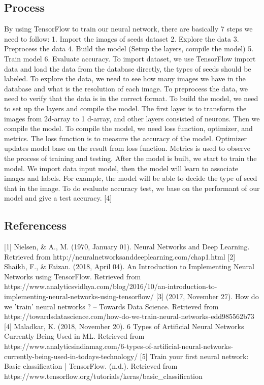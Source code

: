 \subsection{Process}
By using TensorFlow to train our neural network, there are basically 7 steps we need to follow: 1. Import the images of seeds dataset 2. Explore the data 3. Preprocess the data 4. Build the model (Setup the layers, compile the model) 5. Train model 6. Evaluate accuracy. To import dataset, we use TensorFlow import data and load the data from the database directly, the types of seeds should be labeled. To explore the data, we need to see how many images we have in the database and what is the resolution of each image. To preprocess the data, we need to verify that the data is in the correct format. To build the model, we need to set up the layers and compile the model. The first layer is to transform the images from 2d-array to 1 d-array, and other layers consisted of neurons. Then we compile the model. To compile the model, we need loss function, optimizer, and metrics. The loss function is to measure the accuracy of the model. Optimizer updates model base on the result from loss function. Metrics is used to observe the process of training and testing. After the model is built, we start to train the model. We import data input model, then the model will learn to associate images and labels. For example, the model will be able to decide the type of seed that in the image. To do evaluate accuracy test, we base on the performant of our model and give a test accuracy. [4]

\subsection{Referencess}
[1]
Nielsen, \& A., M. (1970, January 01). Neural Networks and Deep Learning. Retrieved from http://neuralnetworksanddeeplearning.com/chap1.html
[2]
Shaikh, F., \& Faizan. (2018, April 04). An Introduction to Implementing Neural Networks using TensorFlow. Retrieved from https://www.analyticsvidhya.com/blog/2016/10/an-introduction-to-implementing-neural-networks-using-tensorflow/
[3]
(2017, November 27). How do we 'train' neural networks ? – Towards Data Science. Retrieved from https://towardsdatascience.com/how-do-we-train-neural-networks-edd985562b73
[4]
Maladkar, K. (2018, November 20). 6 Types of Artificial Neural Networks Currently Being Used in ML. Retrieved from https://www.analyticsindiamag.com/6-types-of-artificial-neural-networks-currently-being-used-in-todays-technology/
[5]
Train your first neural network: Basic classification  |  TensorFlow. (n.d.). Retrieved from https://www.tensorflow.org/tutorials/keras/basic\_classification
